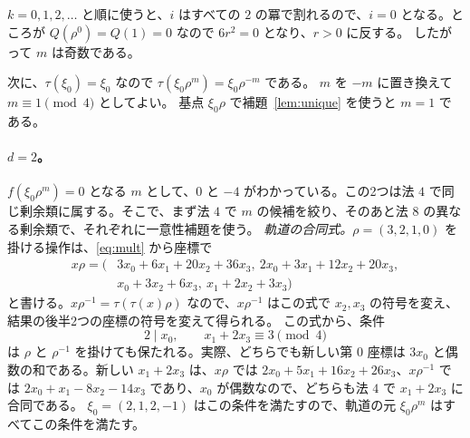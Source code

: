 \documentclass[a4paper,11pt]{ltjsarticle}
\theoremstyle{jplain}
\numberwithin{equation}{section}
\numberwithin{table}{section}
\begin{document}
$k=0,1,2,\dots$ と順に使うと、$i$ はすべての $2$ の冪で割れるので、$i=0$ となる。ところが $Q(\rho^0)=Q(1)=0$ なので $6r^2=0$ となり、$r>0$ に反する。
したがって $m$ は奇数である。

次に、$\tau(\xi_0)=\xi_0$ なので $\tau(\xi_0\rho^m)=\xi_0\rho^{-m}$ である。
$m$ を $-m$ に置き換えて $m\equiv1\pmod4$ としてよい。
基点 $\xi_0\rho$ で補題~\ref{lem:unique} を使うと $m=1$ である。

\paragraph{$d=2$。}
$f(\xi_0\rho^m)=0$ となる $m$ として、$0$ と $-4$ がわかっている。この2つは法 $4$ で同じ剰余類に属する。そこで、まず法 $4$ で $m$ の候補を絞り、そのあと法 $8$ の異なる剰余類で、それぞれに一意性補題を使う。
\emph{軌道の合同式。}$\rho=(3,2,1,0)$ を掛ける操作は、\eqref{eq:mult} から座標で
\[
\begin{aligned}
x\rho=(&3x_0+6x_1+20x_2+36x_3,\ 2x_0+3x_1+12x_2+20x_3,\\
&x_0+3x_2+6x_3,\ x_1+2x_2+3x_3)
\end{aligned}
\]
と書ける。$x\rho^{-1}=\tau(\tau(x)\rho)$ なので、$x\rho^{-1}$ はこの式で $x_2,x_3$ の符号を変え、結果の後半2つの座標の符号を変えて得られる。
この式から、条件
\[
2\mid x_0,\qquad x_1+2x_3\equiv3\pmod4
\]
は $\rho$ と $\rho^{-1}$ を掛けても保たれる。実際、どちらでも新しい第 $0$ 座標は $3x_0$ と偶数の和である。新しい $x_1+2x_3$ は、$x\rho$ では $2x_0+5x_1+16x_2+26x_3$、$x\rho^{-1}$ では $2x_0+x_1-8x_2-14x_3$ であり、$x_0$ が偶数なので、どちらも法 $4$ で $x_1+2x_3$ に合同である。
$\xi_0=(2,1,2,-1)$ はこの条件を満たすので、軌道の元 $\xi_0\rho^m$ はすべてこの条件を満たす。
\end{document}
